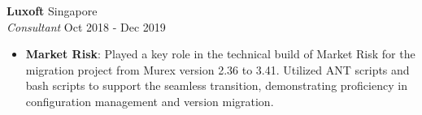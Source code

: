 \documentclass[a4paper]{article}
\newcommand{\resumeItemExperience}[2]{
  \item{
    \begin{justify}
    \setlength{\rightskip}{0.15in} \textbf{#1}{: #2 \vspace{-2pt}}
    \end{justify}
  }
}
\begin{document}
\textbf{Luxoft} \hfill Singapore\\
\textit{Consultant} \hfill Oct 2018 - Dec 2019\\
\vspace{-1mm}
\begin{itemize} \itemsep 1pt
    \resumeItemExperience{Market Risk} {Played a key role in the technical build of Market Risk for the migration project from Murex version 2.36 to 3.41. Utilized ANT scripts and bash scripts to support the seamless transition, demonstrating proficiency in configuration management and version migration.}
\end{itemize}


\end{document}
